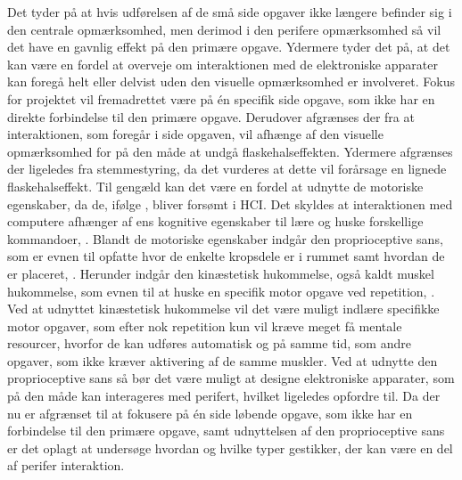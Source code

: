 Det tyder på at hvis udførelsen af de små side opgaver ikke længere befinder sig i den centrale opmærksomhed, men derimod i den perifere opmærksomhed så vil det have en gavnlig effekt på den primære opgave. Ydermere tyder det på, at det kan være en fordel at overveje om interaktionen med de elektroniske apparater kan foregå helt eller delvist uden den visuelle opmærksomhed er involveret. Fokus for projektet vil fremadrettet være på én specifik side opgave, som ikke har en direkte forbindelse til den primære opgave. Derudover afgrænses der fra at interaktionen, som foregår i side opgaven, vil afhænge af den visuelle opmærksomhed for på den måde at undgå flaskehalseffekten. Ydermere afgrænses der ligeledes fra stemmestyring, da det vurderes at dette vil forårsage en lignede flaskehalseffekt. Til gengæld kan det være en fordel at udnytte de motoriske egenskaber, da de, ifølge \textcite[s. 187]{PDF:PeripheralInteraction}, bliver forsømt i HCI. Det skyldes at interaktionen med computere afhænger af ens kognitive egenskaber til lære og huske forskellige kommandoer, \parencite[s. 187]{PDF:PeripheralInteraction}. Blandt de motoriske egenskaber indgår den proprioceptive sans, som er evnen til opfatte hvor de enkelte kropsdele er i rummet samt hvordan de er placeret, \parencite[s. 193]{PDF:PeripheralInteraction}. Herunder indgår den kinæstetisk hukommelse, også kaldt muskel hukommelse, som evnen til at huske en specifik motor opgave ved repetition, \parencite[s. 193]{PDF:PeripheralInteraction}. Ved at udnyttet kinæstetisk hukommelse vil det være muligt indlære specifikke motor opgaver, som efter nok repetition kun vil kræve meget få mentale resourcer, hvorfor de kan udføres automatisk og på samme tid, som andre opgaver, som ikke kræver aktivering af de samme muskler. Ved at udnytte den proprioceptive sans så bør det være muligt at designe elektroniske apparater, som på den måde kan interageres med perifert, hvilket \textcite[s. 202]{PDF:PeripheralInteraction} ligeledes opfordre til.\blankline
%
Da der nu er afgrænset til at fokusere på én side løbende opgave, som ikke har en forbindelse til den primære opgave, samt udnyttelsen af den proprioceptive sans er det oplagt at undersøge hvordan og hvilke typer gestikker, der kan være en del af perifer interaktion.      




 
